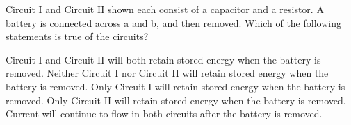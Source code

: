 \documentclass{../../oss-apphys-exam}
\begin{document}
\begin{multicols*}{2}
  \question Circuit I and Circuit II shown each consist of a capacitor and a
  resistor. A battery is connected across a and b, and then removed. Which of
  the following statements is true of the circuits?
  \begin{center}
    \hspace{.5in}
  \end{center}
  \begin{choices}
    \choice Circuit I and Circuit II will both retain stored energy when the
    battery is removed.
    \choice Neither Circuit I nor Circuit II will retain stored energy when
    the battery is removed.
    \choice Only Circuit I will retain stored energy when the battery is
    removed.
    \choice Only Circuit II will retain stored energy when the battery is
    removed.
    \choice Current will continue to flow in both circuits after the battery
    is removed.
  \end{choices}
  \columnbreak
  

\end{multicols*}
\end{document}
